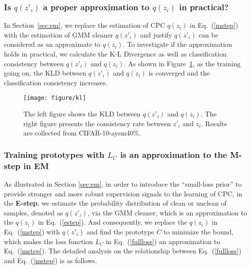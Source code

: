 \documentclass{article} \usepackage{iclr2023_conference,times}
\begin{document}
\subsubsection{Is $q(z'_{i})$ a proper approximation to $q(z_i)$ in practical?} 
In Section~\ref{sec:em}, we replace the estimation of CPC $q(z_i)$ in Eq.~(\ref{mstep}) with the estimation of GMM cleaner $q(z'_i)$ and justify $q(z'_{i})$ can be considered as an approximate to $q(z_i)$. To investigate if the approximation holds in practical, we calculate the K-L Divergence as well as classification consistency between $q(z'_{i})$ and $q(z_i)$. As shown in Figure~\ref{fig:kl}, as the training going on, the KLD  between $q(z'_{i})$ and $q(z_i)$ is converged and the classification consistency increases. 
\begin{figure}[t]
\centering
  \texttt{[image: figure/kl]}
    \vspace{-2\baselineskip}
  \caption{ The left figure shows the KLD between $q(z'_{i})$ and $q(z_i)$. The right figure presents the consistency rate between $z'_i$ and $z_i$. Results are collected from CIFAR-10-aysm40\%. }
\label{fig:kl}
\end{figure}

\subsubsection{Training prototypes with \texttt{$L_C$} is an approximation to the M-step in EM} \label{app:loss}
As illustrated in Section \ref{sec:em},  in order to introduce the ``small-loss prior'' to provide stronger and more robust supervision signals to the learning of CPC, in the \textbf{E-step}, we estimate the probability distribution of clean or unclean of samples, denoted as $q(z'_i)$, via the GMM cleaner, which is an approximation to the $q(z_i)$ in Eq.~(\ref{estep}). And consequently, we replace the $q(z_i)$ in  Eq.~(\ref{mstep}) with $q(z'_i)$ and find the prototype $C$ to minimize the bound, which makes the loss function $L_C$ in Eq.~(\ref{fullloss}) an approximation to Eq.~(\ref{mstep}). The detailed analysis on the relationship between Eq.~(\ref{fullloss}) and Eq.~(\ref{mstep}) is as follows.
\end{document}

